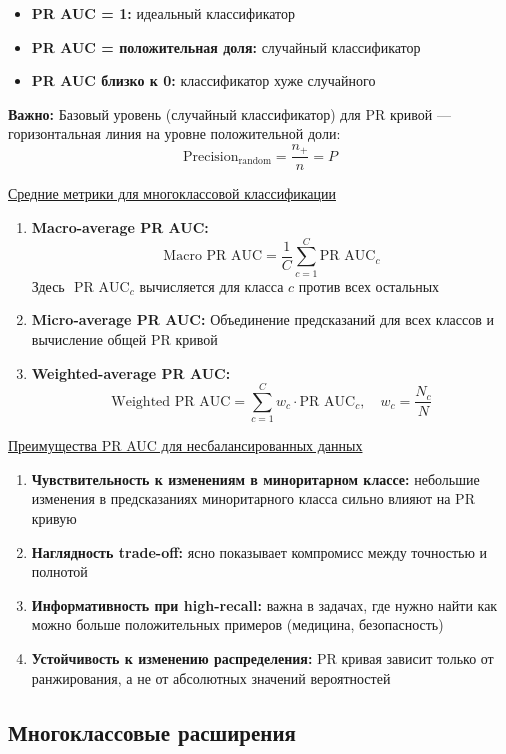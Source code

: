 \begin{itemize}
    \item \textbf{PR AUC = 1:} идеальный классификатор
    \item \textbf{PR AUC = положительная доля:} случайный классификатор
    \item \textbf{PR AUC близко к 0:} классификатор хуже случайного
\end{itemize}

\textbf{Важно:} Базовый уровень (случайный классификатор) для PR кривой --- горизонтальная линия на уровне положительной доли:
\[ \text{Precision}_{\text{random}} = \frac{n_+}{n} = P \]

\underline{Средние метрики для многоклассовой классификации}

\begin{enumerate}
    \item \textbf{Macro-average PR AUC:}
    \[ \text{Macro PR AUC} = \frac{1}{C} \sum_{c=1}^C \text{PR AUC}_c \]
    Здесь $\text{ PR AUC}_c$ вычисляется для класса $c$ против всех остальных
    
    \item \textbf{Micro-average PR AUC:} Объединение предсказаний для всех классов и вычисление общей PR кривой
    
    \item \textbf{Weighted-average PR AUC:}
    \[ \text{Weighted PR AUC} = \sum_{c=1}^C w_c \cdot \text{PR AUC}_c, \quad w_c = \frac{N_c}{N} \]
\end{enumerate}

\underline{Преимущества PR AUC для несбалансированных данных}

\begin{enumerate}
    \item \textbf{Чувствительность к изменениям в миноритарном классе:} небольшие изменения в предсказаниях
    миноритарного класса сильно влияют на PR кривую
    \item \textbf{Наглядность trade-off:} ясно показывает компромисс между точностью и полнотой
    \item \textbf{Информативность при high-recall:} важна в задачах, где нужно найти как можно больше положительных
    примеров (медицина, безопасность)
    \item \textbf{Устойчивость к изменению распределения:} PR кривая зависит только от ранжирования, а не от абсолютных
    значений вероятностей
\end{enumerate}

\subsection{Многоклассовые расширения}

